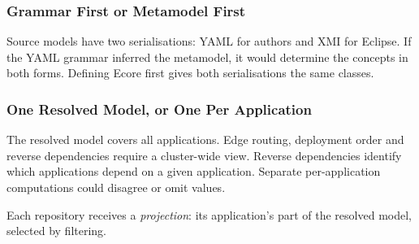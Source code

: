 \subsubsection{Grammar First or Metamodel First}
\label{sec:grammarfirst}

Source models have two serialisations: YAML for authors and XMI for Eclipse.
If the YAML grammar inferred the metamodel, it would determine the concepts in
both forms. Defining Ecore first gives both serialisations the same classes.

\subsubsection{One Resolved Model, or One Per Application}
\label{sec:oneresolved}

The resolved model covers all applications. Edge routing, deployment order and
reverse dependencies require a cluster-wide view. Reverse dependencies identify
which applications depend on a given application. Separate per-application
computations could disagree or omit values.

Each repository receives a \emph{projection}: its application's part of the
resolved model, selected by filtering.
